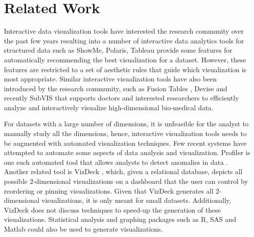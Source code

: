 \section{Related Work}
\label{sec:related}
%
Interactive data visualization tools have interested the research community over the past few years resulting into a number of interactive data analytics tools for structured data such as ShowMe, Polaris, Tableau \cite{kandel2012profiler,DBLP:journals/tvcg/MackinlayHS07,DBLP:conf/sigmod/KeyHPA12,DBLP:journals/tvcg/Fisher07} provide some features for automatically recommending the best visualization for a dataset. However, these features are restricted to a set of aesthetic rules that guide which visualization is most appropriate.
%
%
Similar interactive visualization tools have also been introduced by the research community, such as Fusion Tables \cite{DBLP:conf/sigmod/GonzalezHJLMSSG10}, Devise \cite{DBLP:conf/sigmod/LivnyRBCDLMW97} and recently SubVIS \cite{Hund2016} that supports doctors and interested researchers to efficiently analyze and interactively visualize high-dimensional bio-medical data.
%
%
%
%

For datasets with a large number of dimensions, it is unfeasible for the analyst to manually study all the dimensions, hence, 
interactive visualization tools needs to be augmented with automated visualization techniques.
%
Few recent systems have attempted to automate some aspects of data analysis and visualization. 
%
Profiler is one such automated tool that allows analysts to detect anomalies in data \cite{kandel2012profiler}. 
%
Another related tool is VizDeck \cite{DBLP:conf/sigmod/KeyHPA12}, which, given a relational database, depicts all possible 2-dimensional visualizations on a dashboard that the user can control by reordering or pinning visualizations. 
%
Given that VizDeck generates all 2-dimensional visualizations, it is only meant for small datasets. 
%
Additionally, VizDeck does not discuss techniques to speed-up the generation of these visualizations.
%
Statistical analysis and graphing packages such as R, SAS and Matlab could also be used to generate visualizations.
%
%

